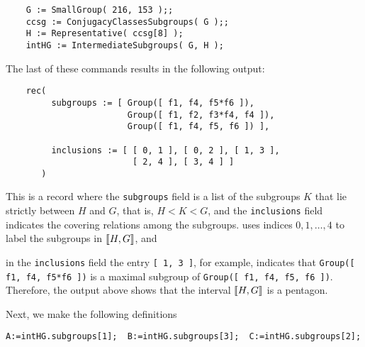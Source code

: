 {\small 
\begin{verbatim}
    G := SmallGroup( 216, 153 );;    
    ccsg := ConjugacyClassesSubgroups( G );;
    H := Representative( ccsg[8] );
    intHG := IntermediateSubgroups( G, H );
\end{verbatim}
}

\noindent 
The last of these commands results in the following output:

{\small 
\begin{verbatim}
    rec( 
         subgroups := [ Group([ f1, f4, f5*f6 ]), 
                        Group([ f1, f2, f3*f4, f4 ]), 
                        Group([ f1, f4, f5, f6 ]) ], 

         inclusions := [ [ 0, 1 ], [ 0, 2 ], [ 1, 3 ], 
                         [ 2, 4 ], [ 3, 4 ] ] 
       )
\end{verbatim}
}

\noindent This is a record where the {\tt subgroups} field is a list of
the subgroups $K$ that lie strictly between $H$ and $G$, that is, $H < K < G$,
and the {\tt inclusions} field indicates the covering
relations among the subgroups.
\gap uses indices $0, 1, \dots, 4$ to label the subgroups 
in $\llbracket H, G\rrbracket$, and %


in the {\tt inclusions} field the entry {\tt [ 1, 3 ]}, for example, indicates that 
{\tt Group([ f1, f4, f5*f6 ])} is a maximal subgroup of 
{\tt Group([ f1, f4, f5, f6 ])}.
Therefore, the \gap output above shows that the interval 
$\llbracket H, G \rrbracket$ is a pentagon.

Next, we make the following definitions 

{\small 
\begin{verbatim}
A:=intHG.subgroups[1];  B:=intHG.subgroups[3];  C:=intHG.subgroups[2];
\end{verbatim}
}

